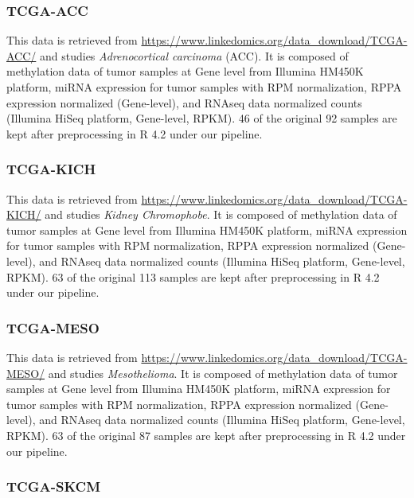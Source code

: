 \documentclass[
]{article}
\begin{document}
\hypertarget{tcga-acc}{%
\subsubsection{TCGA-ACC}\label{tcga-acc}}

This data is retrieved from \url{https://www.linkedomics.org/data_download/TCGA-ACC/} and studies \emph{Adrenocortical carcinoma} (ACC). It is composed of methylation data of tumor samples at Gene level from Illumina HM450K platform, miRNA expression for tumor samples with RPM normalization, RPPA expression normalized (Gene-level), and RNAseq data normalized counts (Illumina HiSeq platform, Gene-level, RPKM). 46 of the original 92 samples are kept after preprocessing in R 4.2 under our pipeline.

\hypertarget{tcga-kich}{%
\subsubsection{TCGA-KICH}\label{tcga-kich}}

This data is retrieved from \url{https://www.linkedomics.org/data_download/TCGA-KICH/} and studies \emph{Kidney Chromophobe}. It is composed of methylation data of tumor samples at Gene level from Illumina HM450K platform, miRNA expression for tumor samples with RPM normalization, RPPA expression normalized (Gene-level), and RNAseq data normalized counts (Illumina HiSeq platform, Gene-level, RPKM). 63 of the original 113 samples are kept after preprocessing in R 4.2 under our pipeline.

\hypertarget{tcga-meso}{%
\subsubsection{TCGA-MESO}\label{tcga-meso}}

This data is retrieved from \url{https://www.linkedomics.org/data_download/TCGA-MESO/} and studies \emph{Mesothelioma}. It is composed of methylation data of tumor samples at Gene level from Illumina HM450K platform, miRNA expression for tumor samples with RPM normalization, RPPA expression normalized (Gene-level), and RNAseq data normalized counts (Illumina HiSeq platform, Gene-level, RPKM). 63 of the original 87 samples are kept after preprocessing in R 4.2 under our pipeline.

\hypertarget{tcga-skcm}{%
\subsubsection{TCGA-SKCM}\label{tcga-skcm}}
\end{document}
